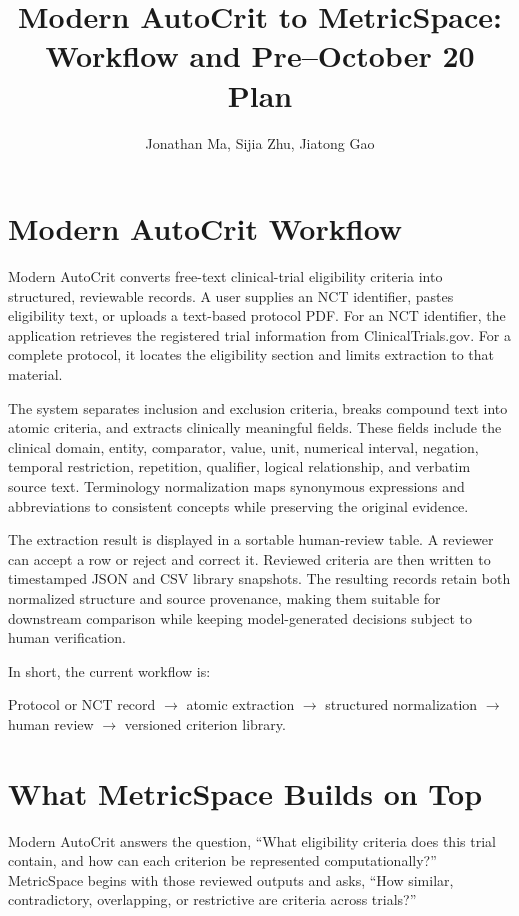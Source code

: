 \documentclass[11pt]{article}
\title{Modern AutoCrit to MetricSpace:\\Workflow and Pre--October 20 Plan}
\author{Jonathan Ma, Sijia Zhu, Jiatong Gao}
\date{}
\begin{document}
\maketitle

\section{Modern AutoCrit Workflow}

Modern AutoCrit converts free-text clinical-trial eligibility criteria into structured, reviewable records. A user supplies an NCT identifier, pastes eligibility text, or uploads a text-based protocol PDF. For an NCT identifier, the application retrieves the registered trial information from ClinicalTrials.gov. For a complete protocol, it locates the eligibility section and limits extraction to that material.

The system separates inclusion and exclusion criteria, breaks compound text into atomic criteria, and extracts clinically meaningful fields. These fields include the clinical domain, entity, comparator, value, unit, numerical interval, negation, temporal restriction, repetition, qualifier, logical relationship, and verbatim source text. Terminology normalization maps synonymous expressions and abbreviations to consistent concepts while preserving the original evidence.

The extraction result is displayed in a sortable human-review table. A reviewer can accept a row or reject and correct it. Reviewed criteria are then written to timestamped JSON and CSV library snapshots. The resulting records retain both normalized structure and source provenance, making them suitable for downstream comparison while keeping model-generated decisions subject to human verification.

In short, the current workflow is:

\begin{center}
Protocol or NCT record
$\longrightarrow$
atomic extraction
$\longrightarrow$
structured normalization
$\longrightarrow$
human review
$\longrightarrow$
versioned criterion library.
\end{center}

\section{What MetricSpace Builds on Top}

Modern AutoCrit answers the question, ``What eligibility criteria does this trial contain, and how can each criterion be represented computationally?'' MetricSpace begins with those reviewed outputs and asks, ``How similar, contradictory, overlapping, or restrictive are criteria across trials?''
\end{document}
